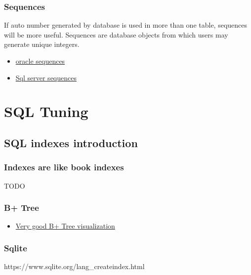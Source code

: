 \documentclass[
  letterpaper,
  DIV=11,
  numbers=noendperiod]{scrreprt}
\providecommand{\tightlist}{%
  \setlength{\itemsep}{0pt}\setlength{\parskip}{0pt}}\usepackage{longtable,booktabs,array}
\begin{document}
\section{Sequences}\label{sequences}

If auto number generated by database is used in more than one table,
sequences will be more useful. Sequences are database objects from which
users may generate unique integers.

\begin{itemize}
\tightlist
\item
  \href{https://docs.oracle.com/en/database/oracle/oracle-database/21/sqlrf/CREATE-SEQUENCE.html}{oracle
  sequences}
\item
  \href{https://learn.microsoft.com/en-us/sql/t-sql/statements/create-sequence-transact-sql?view=sql-server-ver16}{Sql
  server sequences}
\end{itemize}

\part{SQL Tuning}

\chapter{SQL indexes introduction}\label{sql-indexes-introduction}

\section{Indexes are like book
indexes}\label{indexes-are-like-book-indexes}

TODO

\section{B+ Tree}\label{b-tree}

\begin{itemize}
\tightlist
\item
  \href{https://www.cs.usfca.edu/~galles/visualization/BPlusTree.html}{Very
  good B+ Tree visualization}
\end{itemize}

\section{Sqlite}\label{sqlite}

https://www.sqlite.org/lang\_createindex.html
\end{document}
